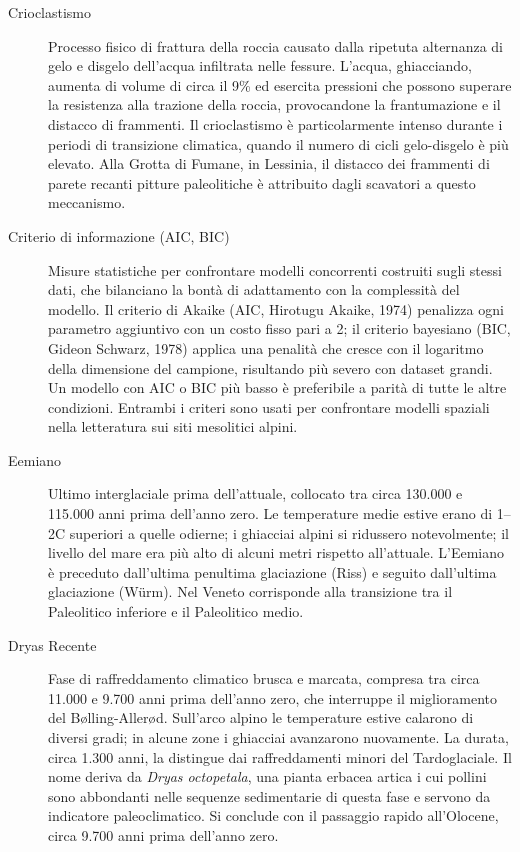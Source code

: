 \begin{description}
\item[Crioclastismo] Processo fisico di frattura della roccia causato dalla ripetuta alternanza di gelo e disgelo dell'acqua infiltrata nelle fessure. L'acqua, ghiacciando, aumenta di volume di circa il 9\% ed esercita pressioni che possono superare la resistenza alla trazione della roccia, provocandone la frantumazione e il distacco di frammenti. Il crioclastismo è particolarmente intenso durante i periodi di transizione climatica, quando il numero di cicli gelo-disgelo è più elevato. Alla Grotta di Fumane, in Lessinia, il distacco dei frammenti di parete recanti pitture paleolitiche è attribuito dagli scavatori a questo meccanismo.

\item[Criterio di informazione (AIC, BIC)] Misure statistiche per confrontare modelli concorrenti costruiti sugli stessi dati, che bilanciano la bontà di adattamento con la complessità del modello. Il criterio di Akaike (AIC, Hirotugu Akaike, 1974) penalizza ogni parametro aggiuntivo con un costo fisso pari a 2; il criterio bayesiano (BIC, Gideon Schwarz, 1978) applica una penalità che cresce con il logaritmo della dimensione del campione, risultando più severo con dataset grandi. Un modello con AIC o BIC più basso è preferibile a parità di tutte le altre condizioni. Entrambi i criteri sono usati per confrontare modelli spaziali nella letteratura sui siti mesolitici alpini.

\item[Eemiano] Ultimo interglaciale prima dell'attuale, collocato tra circa 130.000 e 115.000 anni prima dell'anno zero. Le temperature medie estive erano di 1--2\textdegree C superiori a quelle odierne; i ghiacciai alpini si ridussero notevolmente; il livello del mare era più alto di alcuni metri rispetto all'attuale. L'Eemiano è preceduto dall'ultima penultima glaciazione (Riss) e seguito dall'ultima glaciazione (Würm). Nel Veneto corrisponde alla transizione tra il Paleolitico inferiore e il Paleolitico medio.

\item[Dryas Recente] Fase di raffreddamento climatico brusca e marcata, compresa tra circa 11.000 e 9.700 anni prima dell'anno zero, che interruppe il miglioramento del Bølling-Allerød. Sull'arco alpino le temperature estive calarono di diversi gradi; in alcune zone i ghiacciai avanzarono nuovamente. La durata, circa 1.300 anni, la distingue dai raffreddamenti minori del Tardoglaciale. Il nome deriva da \textit{Dryas octopetala}, una pianta erbacea artica i cui pollini sono abbondanti nelle sequenze sedimentarie di questa fase e servono da indicatore paleoclimatico. Si conclude con il passaggio rapido all'Olocene, circa 9.700 anni prima dell'anno zero.


\end{description}
